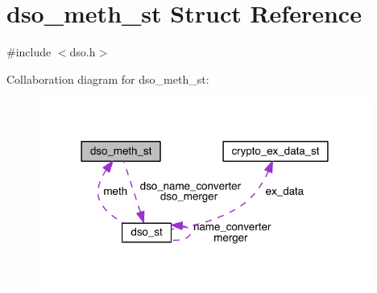 \hypertarget{structdso__meth__st}{}\section{dso\+\_\+meth\+\_\+st Struct Reference}
\label{structdso__meth__st}


{\ttfamily \#include $<$dso.\+h$>$}



Collaboration diagram for dso\+\_\+meth\+\_\+st\+:\nopagebreak
\begin{figure}[H]
\begin{center}
\leavevmode
\includegraphics[width=309pt]{structdso__meth__st__coll__graph}
\end{center}
\end{figure}

